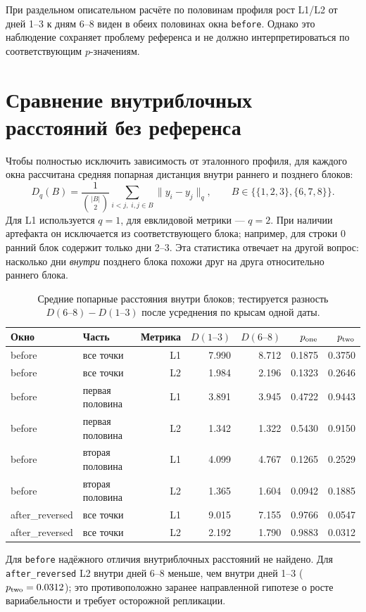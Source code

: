 \documentclass[11pt,a4paper]{article}
\begin{document}
При раздельном описательном расчёте по половинам профиля рост L1/L2 от
дней 1--3 к дням 6--8 виден в обеих половинах окна \texttt{before}.
Однако это наблюдение сохраняет проблему референса и не должно
интерпретироваться по соответствующим $p$-значениям.

\section{Сравнение внутриблочных расстояний без референса}
Чтобы полностью исключить зависимость от эталонного профиля, для каждого
окна рассчитана средняя попарная дистанция внутри раннего и позднего блоков:
\[
  D_q(B)=\frac{1}{\binom{|B|}{2}}
  \sum_{i<j,\;i,j\in B}\lVert y_i-y_j\rVert_q,
  \qquad B\in\{\{1,2,3\},\{6,7,8\}\}.
\]
Для L1 используется $q=1$, для евклидовой метрики --- $q=2$. При наличии
артефакта он исключается из соответствующего блока; например, для строки 0
ранний блок содержит только дни 2--3. Эта статистика отвечает на другой
вопрос: насколько дни \emph{внутри} позднего блока похожи друг на друга
относительно раннего блока.

\begin{table}[ht]
\centering
\caption{Средние попарные расстояния внутри блоков; тестируется разность
$D(6\text{--}8)-D(1\text{--}3)$ после усреднения по крысам одной даты.}
\begin{tabular}{llrrrrr}
\toprule
Окно & Часть & Метрика & $D(1\text{--}3)$ & $D(6\text{--}8)$ &
$p_{\rm one}$ & $p_{\rm two}$ \\
\midrule
before & все точки & L1 & 7.990 & 8.712 & 0.1875 & 0.3750 \\
before & все точки & L2 & 1.984 & 2.196 & 0.1323 & 0.2646 \\
before & первая половина & L1 & 3.891 & 3.945 & 0.4722 & 0.9443 \\
before & первая половина & L2 & 1.342 & 1.322 & 0.5430 & 0.9150 \\
before & вторая половина & L1 & 4.099 & 4.767 & 0.1265 & 0.2529 \\
before & вторая половина & L2 & 1.365 & 1.604 & 0.0942 & 0.1885 \\
after\_reversed & все точки & L1 & 9.015 & 7.155 & 0.9766 & 0.0547 \\
after\_reversed & все точки & L2 & 2.192 & 1.790 & 0.9883 & 0.0312 \\
\bottomrule
\end{tabular}
\end{table}

Для \texttt{before} надёжного отличия внутриблочных расстояний не найдено.
Для \texttt{after\_reversed} L2 внутри дней 6--8 меньше, чем внутри дней
1--3 ($p_{\rm two}=0.0312$); это противоположно заранее направленной
гипотезе о росте вариабельности и требует осторожной репликации.
\end{document}
